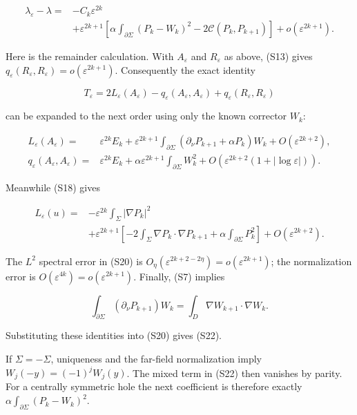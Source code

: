 \documentclass[11pt]{article}
\begin{document}
\[
 \begin{aligned}
 \lambda_\varepsilon-\lambda
 ={}&-C_k\varepsilon^{2k}\\
 &+\varepsilon^{2k+1}\left[
    \alpha\int_{\partial\Sigma}(P_k-W_k)^2
       -2\mathcal C(P_k,P_{k+1})\right]
    +o(\varepsilon^{2k+1}).
 \end{aligned}
 \tag{S22}
\]

Here is the remainder calculation. With \(A_\varepsilon\) and
\(R_\varepsilon\) as above, (S13) gives
\(q_\varepsilon(R_\varepsilon,R_\varepsilon)=o(\varepsilon^{2k+1})\).
Consequently the exact identity

\[
 T_\varepsilon
 =2L_\varepsilon(A_\varepsilon)
       -q_\varepsilon(A_\varepsilon,A_\varepsilon)
       +q_\varepsilon(R_\varepsilon,R_\varepsilon)
\]

can be expanded to the next order using only the known corrector
\(W_k\):

\[
 \begin{aligned}
 L_\varepsilon(A_\varepsilon)
 ={}&\varepsilon^{2k}E_k
 +\varepsilon^{2k+1}
   \int_{\partial\Sigma}(\partial_\nu P_{k+1}+\alpha P_k)W_k
 +O(\varepsilon^{2k+2}),\\
 q_\varepsilon(A_\varepsilon,A_\varepsilon)
 ={}&\varepsilon^{2k}E_k
 +\alpha\varepsilon^{2k+1}\int_{\partial\Sigma}W_k^2
 +O(\varepsilon^{2k+2}(1+|\log\varepsilon|)).
 \end{aligned}
\]

Meanwhile (S18) gives

\[
 \begin{aligned}
 L_\varepsilon(u)
 ={}&-\varepsilon^{2k}\int_\Sigma|\nabla P_k|^2\\
 &+\varepsilon^{2k+1}
   \left[-2\int_\Sigma\nabla P_k\cdot\nabla P_{k+1}
               +\alpha\int_{\partial\Sigma}P_k^2\right]
   +O(\varepsilon^{2k+2}).
 \end{aligned}
\]

The \(L^2\) spectral error in (S20) is
\(O_\eta(\varepsilon^{2k+2-2\eta})=o(\varepsilon^{2k+1})\); the
normalization error is \(O(\varepsilon^{4k})=o(\varepsilon^{2k+1})\).
Finally, (S7) implies

\[
 \int_{\partial\Sigma}(\partial_\nu P_{k+1})W_k
 =\int_D\nabla W_{k+1}\cdot\nabla W_k.
\]

Substituting these identities into (S20) gives (S22).

If \(\Sigma=-\Sigma\), uniqueness and the far-field normalization imply
\(W_j(-y)=(-1)^jW_j(y)\). The mixed term in (S22) then vanishes by
parity. For a centrally symmetric hole the next coefficient is therefore
exactly \(\alpha\int_{\partial\Sigma}(P_k-W_k)^2\).
\end{document}
